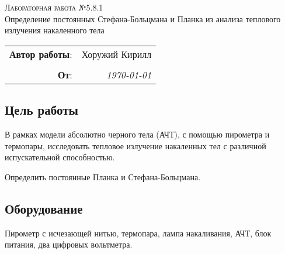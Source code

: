 
\phantom{42}
\vspace{20mm}

\begin{center}
    \LARGE \textsc{Лабораторная работа №5.8.1} \\
    \vspace{3 mm}
    \large Определение постоянных Стефана-Больцмана и Планка из анализа теплового излучения накаленного тела
\end{center}


\phantom{42}

\begin{flushright}
    \begin{tabular}{rr}
        \textbf{Автор работы}: 
        & Хоружий Кирилл \\
        & \\
        \textbf{От}: &
        \textit{\today}\\
    \end{tabular}
\end{flushright}

\thispagestyle{empty}

\vspace{10mm}


\subsection*{Цель работы}
\begin{enumerate*}
    \item В рамках модели абсолютно черного тела (АЧТ), с помощью пирометра и термопары, исследовать тепловое излучение накаленных тел с различной испускательной способностью.
    \item Определить постоянные Планка и Стефана-Больцмана.
\end{enumerate*}


\subsection*{Оборудование}
Пирометр с исчезающей нитью, термопара, лампа накаливания, АЧТ, блок питания, два цифровых вольтметра. 




\newpage
